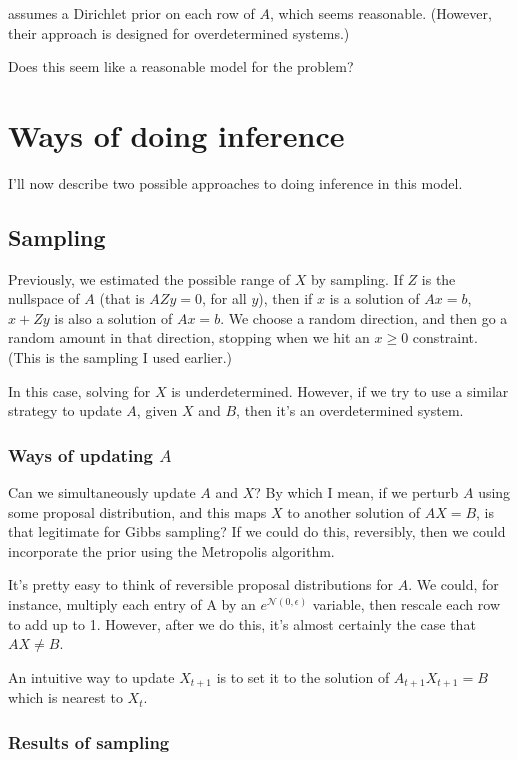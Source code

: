 \documentclass{article}
\begin{document}
\cite{erkkila2010} assumes a Dirichlet prior on each row of $A$, which seems reasonable.
(However, their approach is designed for overdetermined systems.)

Does this seem like a reasonable model for the problem?

\section{Ways of doing inference}

I'll now describe two possible approaches to doing inference in this model.

\subsection{Sampling}

Previously, we estimated the possible range of $X$ by sampling. If $Z$ is the nullspace
of $A$ (that is $AZy = 0$, for all $y$), then if $x$ is a solution of $Ax=b$, $x + Zy$ is also
a solution of $Ax=b$. We choose a random direction, and then go a random amount in that
direction, stopping when we hit an $x \ge 0$ constraint. (This is the sampling I used
earlier.)

In this case, solving for $X$ is underdetermined. However,
if we try to use a similar strategy to
update $A$, given $X$ and $B$, then it's an overdetermined system.

\subsubsection{Ways of updating $A$}

Can we simultaneously update $A$ and $X$? By which I mean, if we perturb $A$ using some
proposal distribution, and this maps $X$ to another solution of $AX=B$,
is that legitimate for
Gibbs sampling? If we could do this, reversibly, then we could incorporate the prior
using the Metropolis algorithm.

It's pretty easy to think of reversible proposal distributions for $A$. We could, for instance,
multiply each entry of A by an $e^{\mathcal{N}(0,\epsilon)}$ variable, then rescale each row to add
up to 1. However,
after we do this, it's almost certainly the case that $AX \ne B$.

An intuitive way to update $X_{t+1}$ is to set it to the solution of
$A_{t+1} X_{t+1} = B$ which is nearest to $X_t$. 

\subsubsection{Results of sampling}
\end{document}
